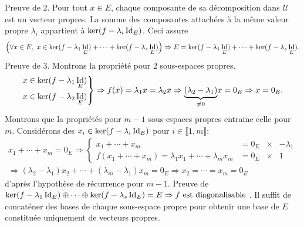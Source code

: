 \begin{demo}
Preuve de 2.\newline
Pour tout $x\in E$, chaque composante de sa décomposition dans $\mathcal{U}$ est un vecteur propres. La somme des composantes attachées à la même valeur propre $\lambda_i$ appartient à $\ker(f-\lambda_i \mathop{\mathrm{Id}}_E)$. Ceci assure 
\[
  \left( \forall x \in E, \; x\in \ker(f-\lambda_1 \mathop{\mathrm{Id}}_E) + \cdots +\ker(f-\lambda_s \mathop{\mathrm{Id}}_E)\right)
  \Rightarrow E = \ker(f-\lambda_1 \mathop{\mathrm{Id}}_E) + \cdots +\ker(f-\lambda_s \mathop{\mathrm{Id}}_E).
\]
Preuve de 3. \newline
Montrons la propriété pour 2 sous-espaces propres.
\[
  \left. 
  \begin{aligned}
     x &\in \ker(f-\lambda_1 \mathop{\mathrm{Id}}_E)\\
     x &\in \ker(f-\lambda_2 \mathop{\mathrm{Id}}_E)
  \end{aligned}
  \right\rbrace
  \Rightarrow f(x) = \lambda_1 x = \lambda_2 x \Rightarrow \underset{\neq 0}{\underbrace{(\lambda_2 - \lambda_1)}}x = 0_E \Rightarrow x = 0_E.
\]
Montrons que la propriétés pour $m-1$ sous-espaces propres entraine celle pour $m$. Considérons des $x_i \in \ker(f-\lambda_i \mathop{\mathrm{Id}}_E)$ pour $i\in \llbracket 1,m\rrbracket$:
\begin{multline*}
  x_1 + \cdots +x_m = 0_E
  \Rightarrow
  \left\lbrace
  \begin{aligned}
  x_1 + \cdots +x_m &= 0_E &\times& -\lambda_1\\  
  f(x_1 + \cdots +x_m)= \lambda_1 x_1 + \cdots + \lambda_m x_m  &= 0_E &\times&1 
  \end{aligned}
   \right. \\
   \Rightarrow
   (\lambda_2 - \lambda_1)x_2 + \cdots + (\lambda_m - \lambda_1)x_m = 0_E
   \Rightarrow x_2 = \cdots = x_m = 0_E
\end{multline*}
d'après l'hypothèse de récurrence pour $m-1$.\medskip\newline 
\indent \textbullet\hspace{0.5cm} Preuve de  $\ker(f-\lambda_1 \mathop{\mathrm{Id}}_E) \oplus \cdots \oplus \ker(f-\lambda_s \mathop{\mathrm{Id}}_E) = E \Rightarrow f \text{ est diagonalisable }$.\newline
Il suffit de concaténer des bases de chaque sous-espace propre pour obtenir une base de $E$ constituée uniquement de vecteurs propres.
\end{demo}

